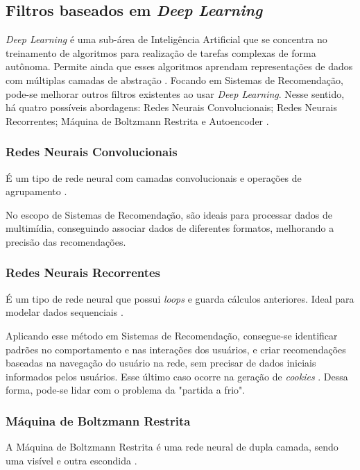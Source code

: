 \subsection{Filtros baseados em \textit{Deep Learning}}\label{subsec:filtrodeep}
\textit{Deep Learning} é uma sub-área de Inteligência Artificial que se concentra no treinamento de algoritmos para 
realização de tarefas complexas de forma autônoma. Permite ainda que esses algoritmos aprendam representações de 
dados com múltiplas camadas de abstração \cite{LeCun2015}. Focando em Sistemas de Recomendação, 
pode-se melhorar outros filtros existentes ao usar \textit{Deep Learning}. Nesse sentido, há quatro possíveis 
abordagens: Redes Neurais Convolucionais; Redes Neurais Recorrentes; Máquina de Boltzmann Restrita e Autoencoder 
\cite{elSisi2020}.

\subsubsection{Redes Neurais Convolucionais}\label{subsubsec:rnc}
É um tipo de rede neural com camadas convolucionais e operações de agrupamento \cite{elSisi2020}.

No escopo de Sistemas de Recomendação, são ideais para processar dados de multimídia, conseguindo associar dados de 
diferentes formatos, melhorando a precisão das recomendações.

\subsubsection{Redes Neurais Recorrentes}\label{subsubsec:rnr}
É um tipo de rede neural que possui \textit{loops} e guarda cálculos anteriores. Ideal para modelar dados sequenciais 
\cite{elSisi2020}.

Aplicando esse método em Sistemas de Recomendação, consegue-se identificar padrões no comportamento e nas interações dos usuários,
e criar recomendações baseadas na navegação do usuário na rede, sem precisar de dados iniciais informados pelos
usuários. Esse último caso ocorre na geração de \textit{cookies} \cite{elSisi2020}. Dessa forma, pode-se lidar com o problema 
da "partida a frio".

\subsubsection{Máquina de Boltzmann Restrita}\label{subsubsec:boltzmann}
A Máquina de Boltzmann Restrita é uma rede neural de dupla camada, sendo uma visível e outra escondida \cite{elSisi2020}. 


